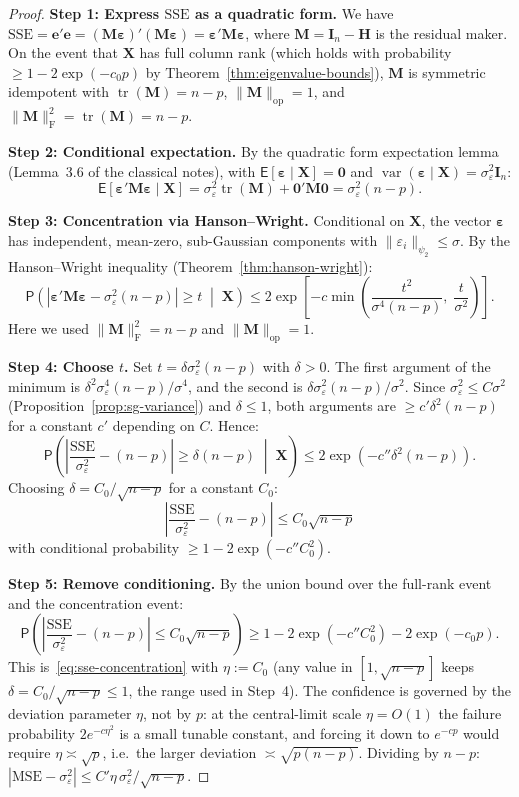 \documentclass[14pt]{extarticle}
\theoremstyle{plain}
\theoremstyle{definition}
\theoremstyle{remark}
\newcommand\expc{\mathsf{E}}
\newcommand\prb{\mathsf{P}}
\DeclareMathOperator\var{var}
\DeclareMathOperator\tr{tr}
\newcommand{\SSE}{\mathrm{SSE}}
\newcommand{\MSE}{\mathrm{MSE}}
\newcommand{\bX}{\mathbf{X}}
\newcommand{\be}{\boldsymbol{\varepsilon}}
\newcommand{\bI}{\mathbf{I}}
\newcommand{\bH}{\mathbf{H}}
\newcommand{\bM}{\mathbf{M}}
\newcommand{\bzero}{\mathbf{0}}
\newcommand{\opnorm}[1]{\|#1\|_{\mathrm{op}}}
\newcommand{\fnorm}[1]{\|#1\|_{\mathrm{F}}}
\begin{document}
\begin{proof}
\textbf{Step 1: Express $\SSE$ as a quadratic form.} We have $\SSE = \mathbf{e}'\mathbf{e} = (\bM\be)'(\bM\be) = \be'\bM\be$, where $\bM = \bI_n - \bH$ is the residual maker. On the event that $\bX$ has full column rank (which holds with probability $\geqslant 1 - 2\exp(-c_0 p)$ by Theorem~\ref{thm:eigenvalue-bounds}), $\bM$ is symmetric idempotent with $\tr(\bM) = n - p$, $\opnorm{\bM} = 1$, and $\fnorm{\bM}^2 = \tr(\bM) = n - p$.

\textbf{Step 2: Conditional expectation.} By the quadratic form expectation lemma (Lemma~3.6 of the classical notes), with $\expc[\be \mid \bX] = \bzero$ and $\var(\be \mid \bX) = \sigma_\varepsilon^2\bI_n$:
\[
\expc[\be'\bM\be \mid \bX] = \sigma_\varepsilon^2\tr(\bM) + \bzero'\bM\bzero = \sigma_\varepsilon^2(n-p).
\]

\textbf{Step 3: Concentration via Hanson--Wright.} Conditional on $\bX$, the vector $\be$ has independent, mean-zero, sub-Gaussian components with $\|\varepsilon_i\|_{\psi_2} \leqslant \sigma$. By the Hanson--Wright inequality (Theorem~\ref{thm:hanson-wright}):
\[
\prb\!\left(|\be'\bM\be - \sigma_\varepsilon^2(n-p)| \geqslant t \;\middle|\; \bX\right) \leqslant 2\exp\!\left[-c\min\!\left(\frac{t^2}{\sigma^4(n-p)},\; \frac{t}{\sigma^2}\right)\right].
\]
Here we used $\fnorm{\bM}^2 = n - p$ and $\opnorm{\bM} = 1$.

\textbf{Step 4: Choose $t$.} Set $t = \delta\sigma_\varepsilon^2(n-p)$ with $\delta > 0$. The first argument of the minimum is $\delta^2\sigma_\varepsilon^4(n-p)/\sigma^4$, and the second is $\delta\sigma_\varepsilon^2(n-p)/\sigma^2$. Since $\sigma_\varepsilon^2 \leqslant C\sigma^2$ (Proposition~\ref{prop:sg-variance}) and $\delta \leqslant 1$, both arguments are $\geqslant c'\delta^2(n-p)$ for a constant $c'$ depending on $C$. Hence:
\[
\prb\!\left(\left|\frac{\SSE}{\sigma_\varepsilon^2} - (n-p)\right| \geqslant \delta(n-p) \;\middle|\; \bX\right) \leqslant 2\exp(-c''\delta^2(n-p)).
\]
Choosing $\delta = C_0/\sqrt{n-p}$ for a constant $C_0$:
\[
\left|\frac{\SSE}{\sigma_\varepsilon^2} - (n-p)\right| \leqslant C_0\sqrt{n-p}
\]
with conditional probability $\geqslant 1 - 2\exp(-c''C_0^2)$.

\textbf{Step 5: Remove conditioning.} By the union bound over the full-rank event and the concentration event:
\[
\prb\!\left(\left|\frac{\SSE}{\sigma_\varepsilon^2} - (n-p)\right| \leqslant C_0\sqrt{n-p}\right) \geqslant 1 - 2\exp(-c''C_0^2) - 2\exp(-c_0 p).
\]
This is~\eqref{eq:sse-concentration} with $\eta := C_0$ (any value in $[1, \sqrt{n-p}]$ keeps $\delta = C_0/\sqrt{n-p} \leqslant 1$, the range used in Step~4). The confidence is governed by the deviation parameter $\eta$, not by $p$: at the central-limit scale $\eta = O(1)$ the failure probability $2e^{-c\eta^2}$ is a small tunable constant, and forcing it down to $e^{-cp}$ would require $\eta \asymp \sqrt{p}$, i.e.\ the larger deviation $\asymp\sqrt{p(n-p)}$. Dividing by $n - p$: $|\MSE - \sigma_\varepsilon^2| \leqslant C'\eta\,\sigma_\varepsilon^2/\sqrt{n-p}$.
\end{proof}
\end{document}
